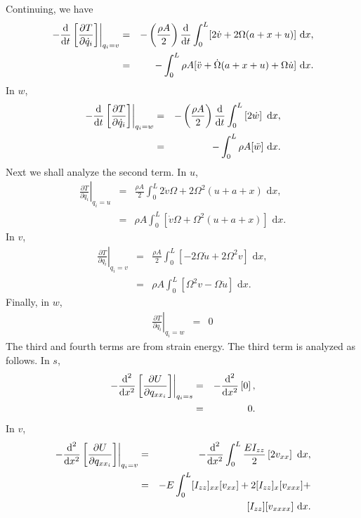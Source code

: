 Continuing, we have
\begin{eqnarray}
\left.-\frac{\text d}{\text dt}\left[\frac{\partial T}{\partial \dot q_i}\right]\right|_{q_i=v}
&=& -\left(\frac{\rho A}{2}\right)\frac{\text d}{\text dt}\int_0^L[2\dot v+2\Omega (a+x+u)]\text{ d}x,\\
&=& -\int_0^L \rho A [\ddot v + \dot \Omega (a+x+u)+\Omega\dot u]\text{ d}x.
\end{eqnarray}
In $w$,
\begin{eqnarray}
\left.-\frac{\text d}{\text dt}\left[\frac{\partial T}{\partial \dot q_i}\right]\right|_{q_i=w}
&=& -\left(\frac{\rho A}{2}\right)\frac{\text d}{\text dt}\int_0^L\left[2\dot w \right]\text{ d}x,\\
&=& -\int_0^L \rho A [\ddot w]\text{ d}x.
\end{eqnarray}
Next we shall analyze the second term. In $u$,
\begin{eqnarray}
\left.\frac{\partial T}{\partial q_i}\right|_{q_i=u} 
&=& \frac{\rho A}{2}\int_0^L 2\dot v\Omega+2\Omega^2(u+a+x)\text{ d}x,\\
&=& \rho A\int_0^L  [\dot v\Omega+\Omega^2(u+a+x)]\text{ d}x.
\end{eqnarray}
In $v$,
\begin{eqnarray}
\left.\frac{\partial T}{\partial q_i}\right|_{q_i=v} 
&=& \frac{\rho A}{2}\int_0^L [-2\Omega\dot u+2\Omega^2v ]\text{ d}x,\\
&=& \rho A\int_0^L  [\Omega^2v-\Omega\dot u] \text{ d}x.
\end{eqnarray}
Finally, in $w$,
\begin{eqnarray}
\left.\frac{\partial T}{\partial q_i}\right|_{q_i=w} 
&=& 0
\end{eqnarray}
The third and fourth terms are from strain energy. The third term is analyzed as follows. In $s$,
\begin{eqnarray}
\left.-\frac{\text d^2}{\text dx^2}\left[\frac{\partial U}{\partial q_{xx_i}}\right]\right|_{q_i=s} 
&=& -\frac{\text d^2}{\text dx^2}\left[ 0\right],\\
&=& 0.
\end{eqnarray}
In $v$,
\begin{eqnarray}
\left.-\frac{\text d^2}{\text dx^2}\left[\frac{\partial U}{\partial q_{xx_i}}\right]\right|_{q_i=v} 
&=& -\frac{\text d^2}{\text dx^2}\int_0^L\frac{EI_{zz}}{2}\left[ 2v_{xx} \right]\text{ d}x,\\
&=& -E\int_0^L [I_{zz}]_{xx}[v_{xx}]+2[I_{zz}]_{x}[v_{xxx}]+\\
& & \qquad [I_{zz}][v_{xxxx}]\text{ d}x. \nonumber
\end{eqnarray}
